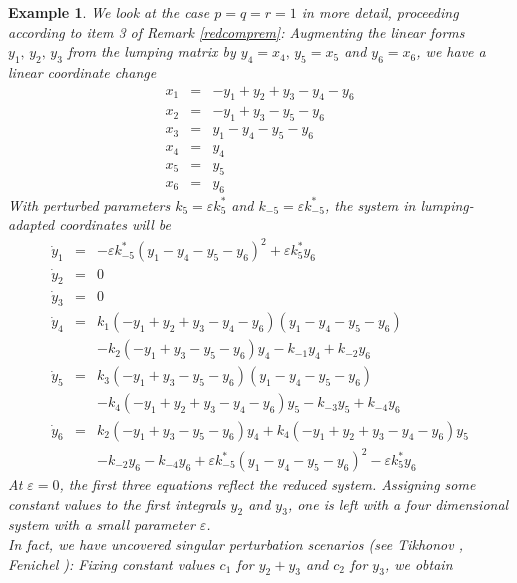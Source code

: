 \documentclass{article}
\newtheorem{example}{Example}
\begin{document}
\begin{example}\label{ex:pqr}{\em
We look at
the case $p=q=r=1$ in more detail, proceeding according to item 3 of Remark \ref{redcomprem}: Augmenting the linear forms $y_1,\,y_2,\,y_3$ from the lumping matrix by $y_4=x_4,\,y_5=x_5$ and $y_6=x_6$, we have a linear coordinate change
\[
\begin{array}{rcl}
x_1 &=&-y_1+y_2+y_3-y_4-y_6\\
                    x_2&=&-y_1 + y_3 - y_5 - y_6\\
                    x_3 &=& y_1 - y_4 - y_5 - y_6\\
  x_4 &=& y_4\\
                            x_5&=& y_5\\
                            x_6 &=&y_6
\end{array}     
\]
With perturbed parameters $k_5=\varepsilon k_5^*$ and $k_{-5}=\varepsilon k_{-5}^*$, the system in lumping-adapted coordinates will be
\[
\begin{array}{rcl}
            \dot y_1&=& -\varepsilon k_{-5}^* (y_1 - y_4 - y_5 - y_6)^2  + \varepsilon k_5^* y_6\\
             \dot y_2&=& 0\\
               \dot y_3&=&0\\           
        \dot y_4&=& k_1 (-y_1 + y_2 + y_3 - y_4 - y_6) (y_1 - y_4 - y_5 - y_6)\\
      &&  - k_2 (-y_1 + y_3 - y_5 - y_6) y_4 - k_{-1} y_4 + k_{-2} y_6\\
     \dot y_5&=& k_3 (-y_1 + y_3 - y_5 - y_6) (y_1 - y_4 - y_5 - y_6)\\
       && - k_4 (-y_1 + y_2 + y_3 - y_4 - y_6) y_5 - k_{-3} y_5 + k_{-4} y_6\\
      \dot y_6&=&k_2 (-y_1 + y_3 - y_5 - y_6) y_4
   + k_4 (-y_1 + y_2 + y_3 - y_4 - y_6) y_5\\&&- k_{-2} y_6 - k_{-4} y_6
        + \varepsilon k_{-5}^* (y_1 - y_4 - y_5 - y_6)^2 
   - \varepsilon k_5^* y_6 
   \end{array}
\]
At $\varepsilon=0$, the first three equations reflect the reduced system. Assigning some constant values to the first integrals $y_2$ and $y_3$, one is left with a four dimensional system with a small parameter $\varepsilon$. \\
In fact, we have uncovered singular perturbation scenarios (see Tikhonov \cite{tikh}, Fenichel \cite{Fenichel1979}): Fixing constant values $c_1$ for $y_2+y_3$ and $c_2$ for $y_3$, we obtain
\[
\begin{array}{rcl}

\end{array}\]}
\end{example}
\end{document}
